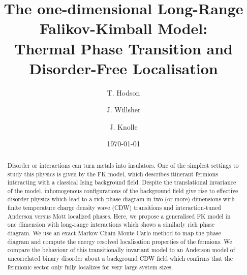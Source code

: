 \title{The one-dimensional Long-Range Falikov-Kimball Model: \\ 
Thermal Phase Transition and Disorder-Free Localisation}

\author{T. Hodson }

\author{J. Willsher }

\author{J. Knolle }
\date{\today}

\begin{abstract}

 Disorder or interactions can turn metals into insulators. One of the simplest settings to study this physics is given by the \ac{FK} model, which describes itinerant fermions interacting with a classical Ising background field. Despite the translational invariance of the model, inhomogenous configurations of the background field give rise to effective disorder physics which lead to a rich phase diagram in two (or more) dimensions with finite temperature charge density wave (CDW) transitions and interaction-tuned Anderson versus Mott localized phases. Here, we propose a generalised \ac{FK} model in one dimension with long-range interactions which shows a similarly rich phase diagram. We use an exact Markov Chain Monte Carlo method to map the phase diagram and compute the energy resolved localisation properties of the fermions. We compare the behaviour of this transitionally invariant model to an Anderson model of uncorrelated binary disorder about a background CDW field which confirms that the fermionic sector only fully localizes for very large system sizes.
\end{abstract}

\maketitle

